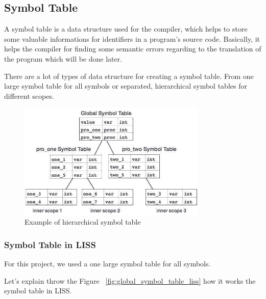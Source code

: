 \documentclass[
  oneside,
  11pt, a4paper,
  footinclude=true,
  headinclude=true,
  cleardoublepage=empty
]{scrbook}
\begin{document}
\subsection{Symbol Table}

A symbol table is a data structure used for the compiler, which helps to store some valuable informations for identifiers in a program's source code. Basically, it helps the compiler for finding some semantic errors regarding to the translation of the program which will be done later.

There are a lot of types of data structure for creating a symbol table. From one large symbol table for all symbols or separated, hierarchical symbol tables for different scopes.

\begin{figure}[h!]
  \centering
    \includegraphics[width=0.8\textwidth]{img/symbol_table_hierarchical.jpg}
    \caption{Example of hierarchical symbol table}
    \label{fig:hierarchical_symbol_table}
\end{figure}


\newpage

\subsubsection{Symbol Table in LISS}

For this project, we used a one large symbol table for all symbols.

Let's explain throw the Figure ~\ref{fig:global_symbol_table_liss} how it works the symbol table in LISS.
\end{document}
